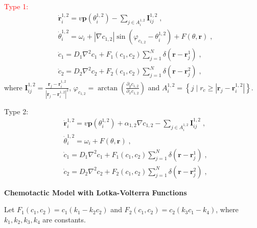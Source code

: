 \documentclass{article}
\begin{document}
\textcolor{red}{Type 1:}
\begin{subequations}
    \begin{align}
        &\dot{\mathbf{r}}_{i}^{1,2}=v\mathbf{p}\left( \theta _{i}^{1,2} \right) -\sum_{j\in A_{i}^{1,2}}{\mathbf{I}_{ij}^{1,2}\;,}\\
        &\dot{\theta}_{i}^{1,2}=\omega_i + \left| \nabla c_{1,2} \right|\sin \left( \varphi _{c_{1,2}}-\theta _{i}^{1,2} \right) +F\left( \theta ,\mathbf{r} \right) \;,\\
        &\dot{c}_1=D_1\nabla ^2c_1+F_1\left( c_1,c_2 \right) \sum_{j=1}^N{\delta \left( \mathbf{r}-\mathbf{r}_{j}^{1} \right) \;,}\\
        &\dot{c}_2=D_2\nabla ^2c_2+F_2\left( c_1,c_2 \right) \sum_{j=1}^N{\delta \left( \mathbf{r}-\mathbf{r}_{j}^{2} \right) \;,}
    \end{align}
\end{subequations}
where $\mathbf{I}_{ij}^{1,2}=\frac{\mathbf{r}_j-\mathbf{r}_{i}^{1,2}}{|\mathbf{r}_j-\mathbf{r}_{i}^{1,2}|^{2}}$, $\varphi _{c_{1,2}}=\arctan \left( \frac{\partial _yc_{1,2}}{\partial _xc_{1,2}} \right) $ and $A_{i}^{1,2}=\left\{ j\mid r_c\geqslant | \mathbf{r}_j-\mathbf{r}_{i}^{1,2} | \right\}$.

\noindent Type 2:
\begin{subequations}
    \begin{align}
        &\dot{\mathbf{r}}_{i}^{1,2}=v\mathbf{p}\left( \theta _{i}^{1,2} \right) +\alpha _{1,2}\nabla c_{1,2}-\sum_{j\in A_{i}^{1,2}}{\mathbf{I}_{ij}^{1,2}\;,}\\
        &\dot{\theta}_{i}^{1,2}=\omega_i + F\left( \theta ,\mathbf{r} \right) \;,\\
        &\dot{c}_1=D_1\nabla ^2c_1+F_1\left( c_1,c_2 \right) \sum_{j=1}^N{\delta \left( \mathbf{r}-\mathbf{r}_{j}^{1} \right) \;,}\\
        &\dot{c}_2=D_2\nabla ^2c_2+F_2\left( c_1,c_2 \right) \sum_{j=1}^N{\delta \left( \mathbf{r}-\mathbf{r}_{j}^{2} \right) \;,}
    \end{align}
\end{subequations}

\noindent\textbf{Chemotactic Model with Lotka-Volterra Functions}

Let $F_1\left( c_1,c_2 \right)=c_1\left( k_1-k_2c_2 \right)$ and $F_2\left( c_1,c_2 \right)=c_2\left( k_3c_1-k_4 \right)$, where $k_1,k_2,k_3,k_4$ are constants.
\end{document}
